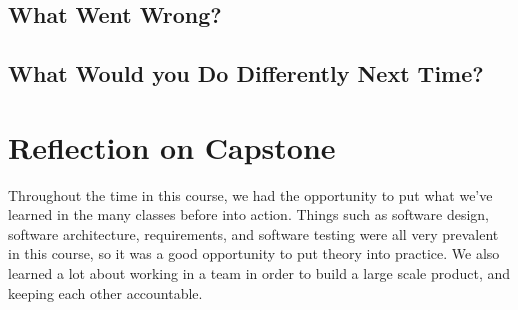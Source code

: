 \documentclass{article}
\begin{document}
\subsection{What Went Wrong?}


\subsection{What Would you Do Differently Next Time?}


\section{Reflection on Capstone}

Throughout the time in this course, we had the opportunity to put what we've
learned in the many classes before into action. Things such as software design,
software architecture, requirements, and software testing were all very
prevalent in this course, so it was a good opportunity to put theory into
practice. We also learned a lot about working in a team in order to build a
large scale product, and keeping each other accountable.
\end{document}
